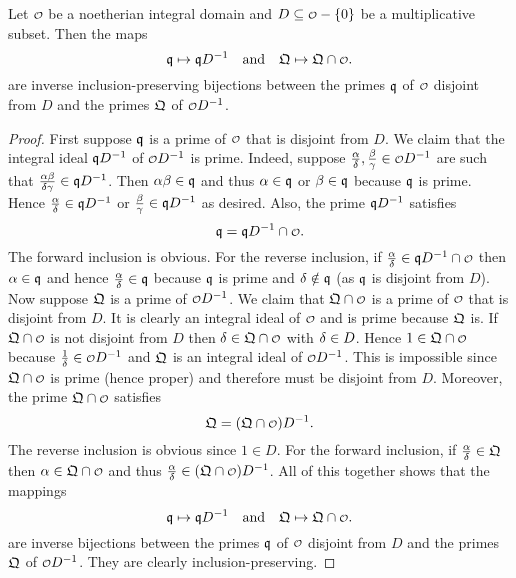     \begin{proposition}\label{prop:localization_prime_bijection}
      Let $\smc{O}$ be a noetherian integral domain and $D \subseteq \smc{O}-\{0\}$ be a multiplicative subset. Then the maps
      \[
        \mf{q} \mapsto \mf{q}D^{-1} \quad \text{and} \quad \mf{Q} \mapsto \mf{Q} \cap \smc{O}.
      \]
      are inverse inclusion-preserving bijections between the primes $\mathfrak{q}$ of $\smc{O}$ disjoint from $D$ and the primes $\mathfrak{Q}$ of $\smc{O}D^{-1}$.
    \end{proposition}
    \begin{proof}
      First suppose $\mathfrak{q}$ is a prime of $\smc{O}$ that is disjoint from $D$. We claim that the integral ideal $\mathfrak{q}D^{-1}$ of $\smc{O}D^{-1}$ is prime. Indeed, suppose $\frac{\a}{\d},\frac{\b}{\g} \in \smc{O}D^{-1}$ are such that $\frac{\alpha\beta}{\delta\gamma} \in \mathfrak{q}D^{-1}$. Then $\alpha\beta \in \mathfrak{q}$ and thus $\alpha \in \mathfrak{q}$ or $\beta \in \mathfrak{q}$ because $\mathfrak{q}$ is prime. Hence $\frac{\alpha}{\delta} \in \mathfrak{q}D^{-1}$ or $\frac{\beta}{\gamma} \in \mathfrak{q}D^{-1}$ as desired. Also, the prime $\mathfrak{q}D^{-1}$ satisfies
      \[
        \mf{q} = \mf{q}D^{-1} \cap \smc{O}.
      \]
      The forward inclusion is obvious. For the reverse inclusion, if $\frac{\a}{\d} \in \mf{q}D^{-1} \cap \smc{O}$ then $\alpha \in \mathfrak{q}$ and hence $\frac{\alpha}{\delta} \in \mathfrak{q}$ because $\mathfrak{q}$ is prime and $\delta \notin \mathfrak{q}$ (as $\mathfrak{q}$ is disjoint from $D$). Now suppose $\mathfrak{Q}$ is a prime of $\smc{O}D^{-1}$. We claim that $\mf{Q} \cap \smc{O}$ is a prime of $\smc{O}$ that is disjoint from $D$. It is clearly an integral ideal of $\smc{O}$ and is prime because $\mathfrak{Q}$ is. If $\mf{Q} \cap \smc{O}$ is not disjoint from $D$ then $\d \in \mf{Q} \cap \smc{O}$ with $\delta \in D$. Hence $1 \in \mf{Q} \cap \smc{O}$ because $\frac{1}{\d} \in \smc{O}D^{-1}$ and $\mathfrak{Q}$ is an integral ideal of $\smc{O}D^{-1}$. This is impossible since $\mf{Q} \cap \smc{O}$ is prime (hence proper) and therefore must be disjoint from $D$. Moreover, the prime $\mf{Q} \cap \smc{O}$ satisfies
      \[
        \mf{Q} = (\mf{Q} \cap \smc{O})D^{-1}.
      \]
      The reverse inclusion is obvious since $1 \in D$. For the forward inclusion, if $\frac{\alpha}{\delta} \in \mathfrak{Q}$ then $\a \in \mf{Q} \cap \smc{O}$ and thus $\frac{\a}{\d} \in (\mf{Q} \cap \smc{O})D^{-1}$. All of this together shows that the mappings
      \[
        \mf{q} \mapsto \mf{q}D^{-1} \quad \text{and} \quad \mf{Q} \mapsto \mf{Q} \cap \smc{O}.
      \]
      are inverse bijections between the primes $\mathfrak{q}$ of $\smc{O}$ disjoint from $D$ and the primes $\mathfrak{Q}$ of $\smc{O}D^{-1}$. They are clearly inclusion-preserving.
    \end{proof}

